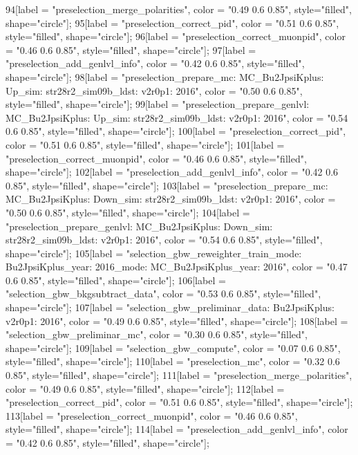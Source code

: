 {	94[label = "preselection_merge_polarities", color = "0.49 0.6 0.85", style="filled", shape="circle"];
	95[label = "preselection_correct_pid", color = "0.51 0.6 0.85", style="filled", shape="circle"];
	96[label = "preselection_correct_muonpid", color = "0.46 0.6 0.85", style="filled", shape="circle"];
	97[label = "preselection_add_genlvl_info", color = "0.42 0.6 0.85", style="filled", shape="circle"];
	98[label = "preselection_prepare_mc\nmode: MC_Bu2JpsiKplus\npolarity: Up\nstrip_sim: str28r2_sim09b_ldst\nversion: v2r0p1\nyear: 2016", color = "0.50 0.6 0.85", style="filled", shape="circle"];
	99[label = "preselection_prepare_genlvl\nmode: MC_Bu2JpsiKplus\npolarity: Up\nstrip_sim: str28r2_sim09b_ldst\nversion: v2r0p1\nyear: 2016", color = "0.54 0.6 0.85", style="filled", shape="circle"];
	100[label = "preselection_correct_pid", color = "0.51 0.6 0.85", style="filled", shape="circle"];
	101[label = "preselection_correct_muonpid", color = "0.46 0.6 0.85", style="filled", shape="circle"];
	102[label = "preselection_add_genlvl_info", color = "0.42 0.6 0.85", style="filled", shape="circle"];
	103[label = "preselection_prepare_mc\nmode: MC_Bu2JpsiKplus\npolarity: Down\nstrip_sim: str28r2_sim09b_ldst\nversion: v2r0p1\nyear: 2016", color = "0.50 0.6 0.85", style="filled", shape="circle"];
	104[label = "preselection_prepare_genlvl\nmode: MC_Bu2JpsiKplus\npolarity: Down\nstrip_sim: str28r2_sim09b_ldst\nversion: v2r0p1\nyear: 2016", color = "0.54 0.6 0.85", style="filled", shape="circle"];
	105[label = "selection_gbw_reweighter_train\ndata_mode: Bu2JpsiKplus\ndata_year: 2016\nmc_mode: MC_Bu2JpsiKplus\nmc_year: 2016", color = "0.47 0.6 0.85", style="filled", shape="circle"];
	106[label = "selection_gbw_bkgsubtract_data", color = "0.53 0.6 0.85", style="filled", shape="circle"];
	107[label = "selection_gbw_preliminar_data\nmode: Bu2JpsiKplus\nversion: v2r0p1\nyear: 2016", color = "0.49 0.6 0.85", style="filled", shape="circle"];
	108[label = "selection_gbw_preliminar_mc", color = "0.30 0.6 0.85", style="filled", shape="circle"];
	109[label = "selection_gbw_compute", color = "0.07 0.6 0.85", style="filled", shape="circle"];
	110[label = "preselection_mc", color = "0.32 0.6 0.85", style="filled", shape="circle"];
	111[label = "preselection_merge_polarities", color = "0.49 0.6 0.85", style="filled", shape="circle"];
	112[label = "preselection_correct_pid", color = "0.51 0.6 0.85", style="filled", shape="circle"];
	113[label = "preselection_correct_muonpid", color = "0.46 0.6 0.85", style="filled", shape="circle"];
	114[label = "preselection_add_genlvl_info", color = "0.42 0.6 0.85", style="filled", shape="circle"];
}
